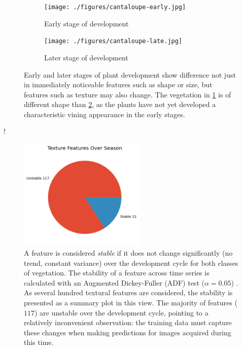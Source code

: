 \documentclass[letterpaper]{report}
\begin{document}
\begin{figure}[H]
	\centering
	\begin{subfigure}[h]{0.45\linewidth}
		\centering
		\texttt{[image: ./figures/cantaloupe-early.jpg]}
		\caption{Early stage of development}
		\label{subfig:cantaloupe-early}	
	\end{subfigure}
	\begin{subfigure}[h]{0.45\linewidth}
		\centering
		\texttt{[image: ./figures/cantaloupe-late.jpg]}
		\caption{Later stage of development}
		\label{subfig:cantaloupe-late}		
	\end{subfigure}%
	\caption[Early and later stages of vining plant development]{Early and later stages of plant development show difference not just in immediately noticeable features such as shape or size, but features such as texture may also change. The vegetation in \ref{subfig:cantaloupe-early} is of different shape  than \ref{subfig:cantaloupe-late}, as the plants have not yet developed a characteristic vining appearance in the early stages.}
	\label{fig:cantaloupe}
\end{figure}!
%


\begin{figure}[h!]
	\centering
	\includegraphics[width=6cm]{./figures/season-texture.png}
	\caption[Stability of factor over growing season]{A feature is considered \textit{stable} if it does not change significantly (no trend, constant variance) over the development cycle for both classes of vegetation. The stability of a feature across time series is calculated with an Augmented Dickey-Fuller (ADF) test ($\alpha=0.05$) \parencite{Dickey1979-ft}. As several hundred textural features are considered, the stability is presented as a summary plot in this view. The majority of features ($117$) are unstable over the development cycle, pointing to a relatively inconvenient observation: the training data must capture these changes when making predictions for images acquired during this time.}
	\label{fig:season-texture}
\end{figure}
\end{document}
